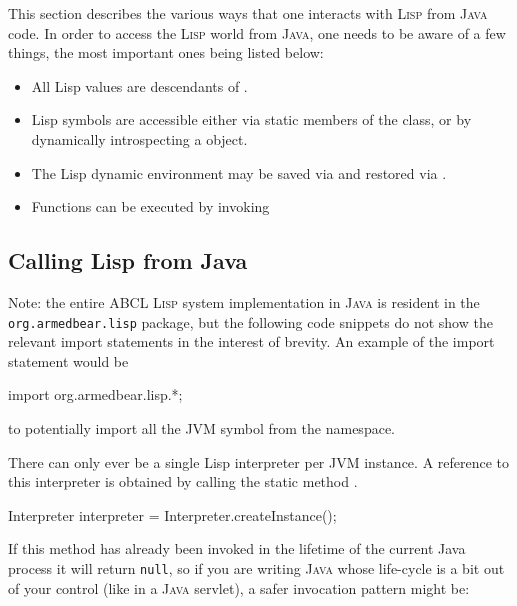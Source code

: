 \documentclass[10pt]{book}
\begin{document}
This section describes the various ways that one interacts with \textsc{Lisp}
from \textsc{Java} code.  In order to access the \textsc{Lisp} world from \textsc{Java}, one needs
to be aware of a few things, the most important ones being listed below:

\begin{itemize}
\item All Lisp values are descendants of .
\item Lisp symbols are accessible either via static members of the
   class, or by dynamically introspecting a 
  object.
\item The Lisp dynamic environment may be saved via
   and restored via
  .
\item Functions can be executed by invoking 
\end{itemize}

\subsection{Calling Lisp from Java}
\label{section:calling-lisp-from-java}

Note: the entire \textsc{ABCL} \textsc{Lisp} system implementation in
\textsc{Java} is resident in the \texttt{org.armedbear.lisp} package,
but the following code snippets do not show the relevant import
statements in the interest of brevity.  An example of the import
statement would be
\begin{listing-java}
  import org.armedbear.lisp.*;
\end{listing-java}
to potentially import all the JVM symbol from the 
namespace.

There can only ever be a single Lisp interpreter per \textsc{JVM} instance.  A
reference to this interpreter is obtained by calling the static method
.

\begin{listing-java}
  Interpreter interpreter = Interpreter.createInstance();
\end{listing-java}

If this method has already been invoked in the lifetime of the current
Java process it will return \texttt{null}, so if you are writing \textsc{Java}
whose life-cycle is a bit out of your control (like in a \textsc{Java} servlet),
a safer invocation pattern might be:
\end{document}

